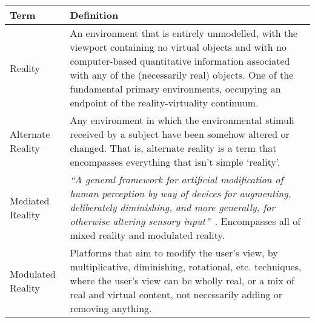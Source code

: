 \begin{center}
\begin{longtable}{ l p{10cm} }

\toprule

\textbf{Term} & \textbf{Definition} \\

\midrule

		
Reality & An environment that is entirely unmodelled, with the viewport containing no virtual objects and with no computer-based quantitative information associated with any of the (necessarily real) objects. One of the fundamental primary environments, occupying an endpoint of the reality-virtuality continuum. \\
		
\midrule
		

Alternate Reality & Any environment in which the environmental stimuli received by a subject have been somehow altered or changed. That is, alternate reality is a term that encompasses everything that isn't simple `reality'. \\

\midrule
		

Mediated Reality & \textit{``A general framework for artificial modification of human perception by way of devices for augmenting, deliberately diminishing, and more generally, for otherwise altering sensory input''}~\cite{Mann2002a}. Encompasses all of mixed reality and modulated reality. \\

\midrule


Modulated Reality & Platforms that aim to modify the user's view, by multiplicative, diminishing, rotational, etc. techniques, where the user's view can be wholly real, or a mix of real and virtual content, not necessarily adding or removing anything. \\

\midrule


\end{longtable}
\end{center}

